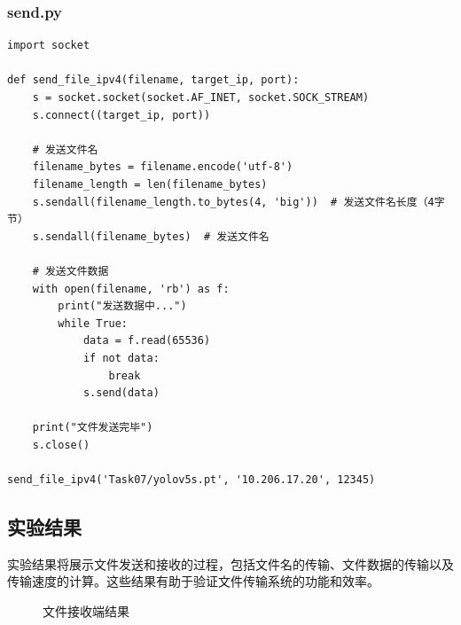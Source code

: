 \documentclass[UTF8,titlepage]{ctexart}
\numberwithin{figure}{section}
\begin{document}
\subsubsection{send.py}
\begin{verbatim}
import socket

def send_file_ipv4(filename, target_ip, port):
    s = socket.socket(socket.AF_INET, socket.SOCK_STREAM)
    s.connect((target_ip, port))

    # 发送文件名
    filename_bytes = filename.encode('utf-8')
    filename_length = len(filename_bytes)
    s.sendall(filename_length.to_bytes(4, 'big'))  # 发送文件名长度（4字节）
    s.sendall(filename_bytes)  # 发送文件名

    # 发送文件数据
    with open(filename, 'rb') as f:
        print("发送数据中...")
        while True:
            data = f.read(65536)
            if not data:
                break
            s.send(data)

    print("文件发送完毕")
    s.close()

send_file_ipv4('Task07/yolov5s.pt', '10.206.17.20', 12345)
\end{verbatim}

\subsection{实验结果}
实验结果将展示文件发送和接收的过程，包括文件名的传输、文件数据的传输以及传输速度的计算。这些结果有助于验证文件传输系统的功能和效率。
\begin{figure}[H]
\centering
 \caption{文件接收端结果}
 \label{}
\end{figure}
\end{document}
